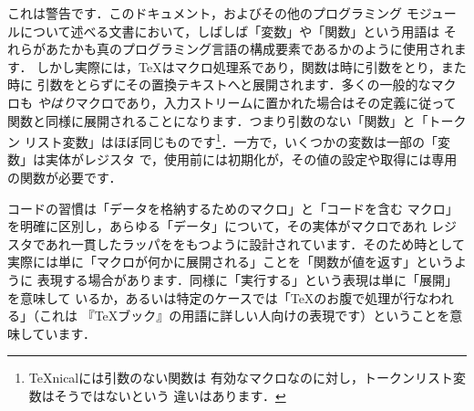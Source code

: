 \documentclass[uplatex,dvipdfmx,full,kernel]{wtpl3doc}
\begin{document}
これは警告です．このドキュメント，およびその他のプログラミング
モジュールについて述べる文書において，しばしば「変数」や「関数」という用語は
それらがあたかも真のプログラミング言語の構成要素であるかのように使用されます．
しかし実際には，\TeX はマクロ処理系であり，関数は時に引数をとり，また時に
引数をとらずにその置換テキストへと展開されます．多くの一般的なマクロも
\emph{やはり}マクロであり，入力ストリームに置かれた場合はその定義に従って
関数と同様に展開されることになります．つまり引数のない「関数」と「トークン
リスト変数」はほぼ同じものです\footnote{{\TeX}nicalには引数のない関数は
有効なマクロなのに対し，トークンリスト変数はそうではないという
違いはあります．}．一方で，いくつかの変数は一部の「変数」は実体がレジスタ
で，使用前には初期化が，その値の設定や取得には専用の関数が必要です．

コードの習慣は「データを格納するためのマクロ」と「コードを含む
マクロ」を明確に区別し，あらゆる「データ」について，その実体がマクロであれ
レジスタであれ一貫したラッパををもつように設計されています．そのため時として
実際には単に「マクロが何かに展開される」ことを「関数が値を返す」というように
表現する場合があります．同様に「実行する」という表現は単に「展開」を意味して
いるか，あるいは特定のケースでは「\TeX のお腹で処理が行なわれる」（これは
『\TeX ブック』の用語に詳しい人向けの表現です）ということを意味しています．
\end{document}
